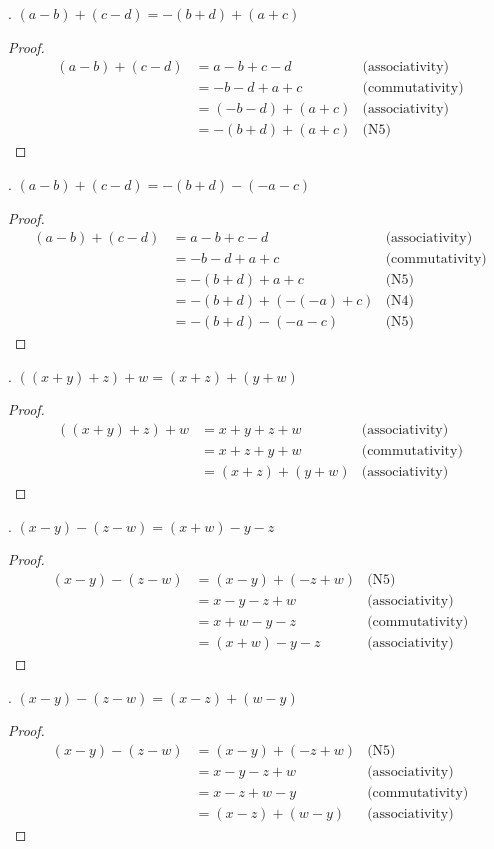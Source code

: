 \documentclass[12pt]{article}
\begin{document}
. $(a-b)+(c-d)=-(b+d)+(a+c)$
\begin{proof}
\begin{align*}
(a-b)+(c-d)&=a-b+c-d &\text{(associativity)} \\
&=-b-d+a+c &\text{(commutativity)} \\
&=(-b-d)+(a+c) &\text{(associativity)} \\
&=-(b+d)+(a+c) &\text{(N5)}
\end{align*}
\end{proof}
. $(a-b)+(c-d)=-(b+d)-(-a-c)$
\begin{proof}
\begin{align*}
(a-b)+(c-d)&=a-b+c-d &\text{(associativity)} \\
&=-b-d+a+c &\text{(commutativity)} \\
&=-(b+d)+a+c &\text{(N5)} \\
&=-(b+d)+(-(-a)+c) &\text{(N4)} \\
&=-(b+d)-(-a-c) &\text{(N5)}
\end{align*}
\end{proof}
. $((x+y)+z)+w=(x+z)+(y+w)$
\begin{proof}
\begin{align*}
((x+y)+z)+w&=x+y+z+w &\text{(associativity)} \\
&=x+z+y+w &\text{(commutativity)} \\
&=(x+z)+(y+w) &\text{(associativity)}
\end{align*}
\end{proof}
. $(x-y)-(z-w)=(x+w)-y-z$
\begin{proof}
\begin{align*}
(x-y)-(z-w)&=(x-y)+(-z+w) &\text{(N5)} \\
&=x-y-z+w &\text{(associativity)} \\
&=x+w-y-z &\text{(commutativity)} \\
&=(x+w)-y-z &\text{(associativity)}
\end{align*}
\end{proof}
. $(x-y)-(z-w)=(x-z)+(w-y)$
\begin{proof}
\begin{align*}
(x-y)-(z-w)&=(x-y)+(-z+w) &\text{(N5)} \\
&=x-y-z+w &\text{(associativity)} \\
&=x-z+w-y &\text{(commutativity)} \\
&=(x-z)+(w-y) &\text{(associativity)}
\end{align*}
\end{proof}
\end{document}

